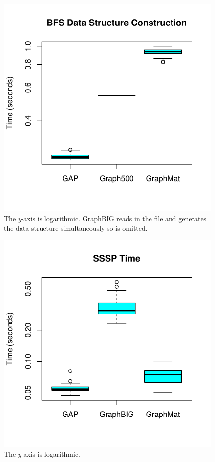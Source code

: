 \documentclass{llncs}
\begin{document}
\begin{figure}
	\centering
	\includegraphics[width=0.6\columnwidth, trim=0 36pt 18pt 0, clip]{graphics/bfs_dsc.pdf}
	\caption{The $y$-axis is logarithmic. GraphBIG reads in the file and generates the data structure simultaneously so is omitted.}
	\label{fig:bfs-dsc}
\end{figure}

\begin{figure}
	\centering
	\includegraphics[width=0.6\columnwidth, trim=0 36pt 18pt 0, clip]{graphics/sssp_time.pdf}
	\caption{The $y$-axis is logarithmic.}
	\label{fig:sssp-time}
\end{figure}
\end{document}
